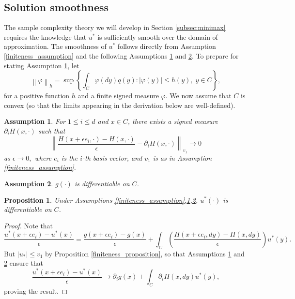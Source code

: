 \documentclass[pdflatex,sn-mathphys-ay]{sn-jnl}%
\numberwithin{equation}{section}
\newcommand\norm[1]{\left\lVert#1\right\rVert}
\newcommand\prs[1]{\left(#1\right)}
\newcommand{\gtz}{\rightarrow0}
\theoremstyle{thmstyleone}%
\newtheorem{proposition}[theorem]{Proposition}%
\theoremstyle{thmstyletwo}%
\theoremstyle{thmstylethree}%
\newtheorem{assumption}{Assumption}
\begin{document}
\subsection{Solution smoothness}
The sample complexity theory we will develop in Section \ref{subsec:minimax} requires the knowledge that $u^*$ is sufficiently smooth over the domain of approximation. The smoothness of $u^*$ follows directly from Assumption \ref{finiteness_assumption} and the following Assumptions \ref{partial_H_assumption} and \ref{differentiable_assumption}. To prepare for stating Assumption \ref{partial_H_assumption}, let
\[
\norm{\varphi}_h=\sup\left\{\int_C\varphi(dy)q(y):|\varphi(y)|\leq h(y),\;y\in C\right\},
\]
for a positive function $h$ and a finite signed measure $\varphi$. We now assume that $C$ is convex (so that the limits appearing in the derivation below are well-defined).
\begin{assumption}
\label{partial_H_assumption}
For $1\leq i\leq d$ and $x\in C$, there exists a signed measure $\partial_i H(x,\cdot)$ such that
\[
\norm{\frac{H(x+\epsilon e_i,\cdot )-H(x,\cdot)}{\epsilon}-\partial_i H(x,\cdot)}_{v_1}\gtz
\]
as $\epsilon\gtz,$ where $e_i$ is the $i$-th basis vector, and $v_1$ is as in Assumption \ref{finiteness_assumption}.
\end{assumption}
\begin{assumption}
\label{differentiable_assumption}
$g(\cdot)$ is differentiable on $C$.
\end{assumption}
\begin{proposition}
\label{differentiable_proposition}
Under Assumptions \ref{finiteness_assumption},\ref{partial_H_assumption},\ref{differentiable_assumption}, $u^*(\cdot)$ is differentiable on $C$.
\end{proposition}
\begin{proof}
    Note that
    \[
        \frac{u^*(x+\epsilon e_i)-u^*(x)}{\epsilon}=\frac{g(x+\epsilon e_i)-g(x)}{\epsilon}+\int_C\prs{\frac{H(x+\epsilon e_i,dy)-H(x,dy)}{\epsilon}}u^*(y).
    \]
    But $|u_*|\leq v_1$ by Proposition \ref{finiteness_proposition}, so that Assumptions \ref{partial_H_assumption} and \ref{differentiable_assumption} ensure that
    \[
    \frac{u^*(x+\epsilon e_i)-u^*(x)}{\epsilon}\rightarrow \partial_i g(x)+\int_C \partial_i H(x,dy)u^*(y),
    \]
    proving the result.
\end{proof}
\end{document}

